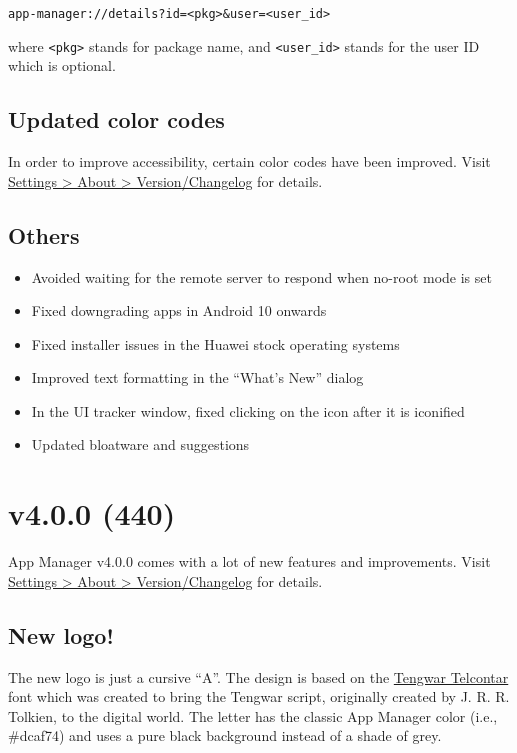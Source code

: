 \begin{verbatim}
app-manager://details?id=<pkg>&user=<user_id>
\end{verbatim}

where \texttt{<pkg>} stands for package name, and \texttt{<user\_id>} stands for the user ID which
is optional.

\subsection{Updated color codes}
In order to improve accessibility, certain color codes have been improved. Visit
\href{app-manager://settings/about/version}{Settings > About > Version/Changelog} for details.

\subsection{Others}
\begin{itemize}
    \item Avoided waiting for the remote server to respond when no-root mode is set
    \item Fixed downgrading apps in Android 10 onwards
    \item Fixed installer issues in the Huawei stock operating systems
    \item Improved text formatting in the ``What's New'' dialog
    \item In the UI tracker window, fixed clicking on the icon after it is iconified
    \item Updated bloatware and suggestions
\end{itemize}

\section{v4.0.0 (440)}\label{sec:v4.0.0-(440)}

App Manager v4.0.0 comes with a lot of new features and improvements. Visit
\href{app-manager://settings/about/version}{Settings > About > Version/Changelog} for details.

\subsection{New logo!}
The new logo is just a cursive ``A''. The design is based on the
\href{https://freetengwar.sourceforge.net/}{Tengwar Telcontar} font which was created to bring the
Tengwar script, originally created by J. R. R. Tolkien, to the digital world. The letter has the
classic App Manager color (i.e., \#dcaf74) and uses a pure black background instead of a shade of
grey.

